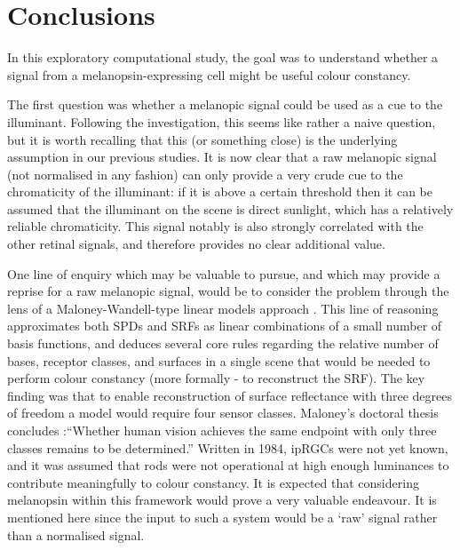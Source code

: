 
\clearpage


\section{Conclusions}

In this exploratory computational study, the goal was to understand whether a signal from a melanopsin-expressing cell might be useful colour constancy.

The first question was whether a melanopic signal could be used as a cue to the illuminant. Following the investigation, this seems like rather a naive question, but it is worth recalling that this (or something close) is the underlying assumption in our previous studies. It is now clear that a raw melanopic signal (not normalised in any fashion) can only provide a very crude cue to the chromaticity of the illuminant: if it is above a certain threshold then it can be assumed that the illuminant on the scene is direct sunlight, which has a relatively reliable chromaticity. This signal notably is also strongly correlated with the other retinal signals, and therefore provides no clear additional value.

One line of enquiry which may be valuable to pursue, and which may provide a reprise for a raw melanopic signal, would be to consider the problem through the lens of a Maloney-Wandell-type linear models approach \citep{maloney_computational_1984,maloney_color_1986}. This line of reasoning approximates both \glspl{SPD} and \glspl{SRF} as linear combinations of a small number of basis functions, and deduces several core rules regarding the relative number of bases, receptor classes, and surfaces in a single scene that would be needed to perform colour constancy (more formally - to reconstruct the \gls{SRF}). The key finding was that to enable reconstruction of surface reflectance with three degrees of freedom a model would require four sensor classes. Maloney's doctoral thesis concludes :``Whether human vision achieves the same endpoint with only three classes remains to be determined.'' Written in 1984, \glspl{ipRGC} were not yet known, and it was assumed that rods were not operational at high enough luminances to contribute meaningfully to colour constancy. It is expected that considering melanopsin within this framework would prove a very valuable endeavour. It is mentioned here since the input to such a system would be a `raw' signal rather than a normalised signal.

